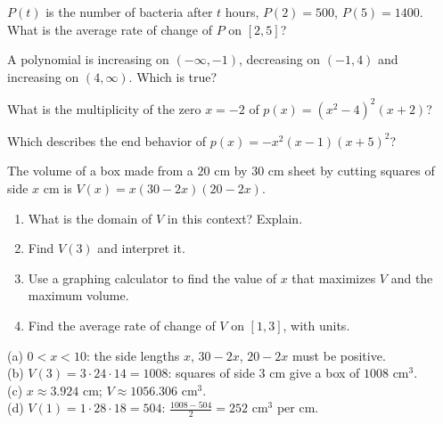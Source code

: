 \begin{exo}[1.2]{}
$P(t)$ is the number of bacteria after $t$ hours, $P(2)=500$, $P(5)=1400$. What is the average rate of change of $P$ on $[2,5]$?
\end{exo}
\begin{exo}[1.4]{}
A polynomial is increasing on $(-\infty,-1)$, decreasing on $(-1,4)$ and increasing on $(4,\infty)$. Which is true?
\end{exo}
\begin{exo}[1.5]{}
What is the multiplicity of the zero $x=-2$ of $p(x)=(x^2-4)^2(x+2)$?
\end{exo}
\begin{exo}[1.6]{}
Which describes the end behavior of $p(x)=-x^2(x-1)(x+5)^2$?
\end{exo}
\begin{exo}{\calcreq}
The volume of a box made from a $20$ cm by $30$ cm sheet by cutting squares of side $x$ cm is $V(x)=x(30-2x)(20-2x)$.
\begin{enumerate}[label=(\alph*)]
\item What is the domain of $V$ in this context? Explain.
\item Find $V(3)$ and interpret it.
\item Use a graphing calculator to find the value of $x$ that maximizes $V$ and the maximum volume.
\item Find the average rate of change of $V$ on $[1,3]$, with units.
\end{enumerate}
\begin{solution}
(a) $0<x<10$: the side lengths $x$, $30-2x$, $20-2x$ must be positive.\\
(b) $V(3)=3\cdot24\cdot14=1008$: squares of side 3 cm give a box of $1008$ cm$^3$.\\
(c) $x\approx3.924$ cm; $V\approx1056.306$ cm$^3$.\\
(d) $V(1)=1\cdot28\cdot18=504$: $\frac{1008-504}{2}=252$ cm$^3$ per cm.
\end{solution}
\end{exo}

